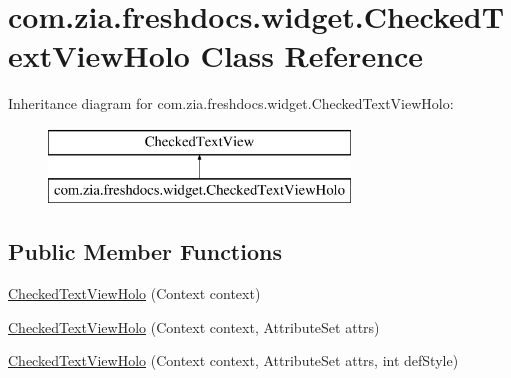 \hypertarget{classcom_1_1zia_1_1freshdocs_1_1widget_1_1_checked_text_view_holo}{\section{com.\-zia.\-freshdocs.\-widget.\-Checked\-Text\-View\-Holo Class Reference}
\label{classcom_1_1zia_1_1freshdocs_1_1widget_1_1_checked_text_view_holo}
}
Inheritance diagram for com.\-zia.\-freshdocs.\-widget.\-Checked\-Text\-View\-Holo\-:\begin{figure}[H]
\begin{center}
\leavevmode
\includegraphics[height=2.000000cm]{classcom_1_1zia_1_1freshdocs_1_1widget_1_1_checked_text_view_holo}
\end{center}
\end{figure}
\subsection*{Public Member Functions}
\begin{DoxyCompactItemize}
\item 
\hyperlink{classcom_1_1zia_1_1freshdocs_1_1widget_1_1_checked_text_view_holo_a5e91e8d5d8b95819d5c09c915f5d68f1}{Checked\-Text\-View\-Holo} (Context context)
\item 
\hyperlink{classcom_1_1zia_1_1freshdocs_1_1widget_1_1_checked_text_view_holo_ab07c63792a3abd349ed16677933f5d32}{Checked\-Text\-View\-Holo} (Context context, Attribute\-Set attrs)
\item 
\hyperlink{classcom_1_1zia_1_1freshdocs_1_1widget_1_1_checked_text_view_holo_a67e4894c26d24a1a3d95cf7a081cf619}{Checked\-Text\-View\-Holo} (Context context, Attribute\-Set attrs, int def\-Style)
\end{DoxyCompactItemize}


